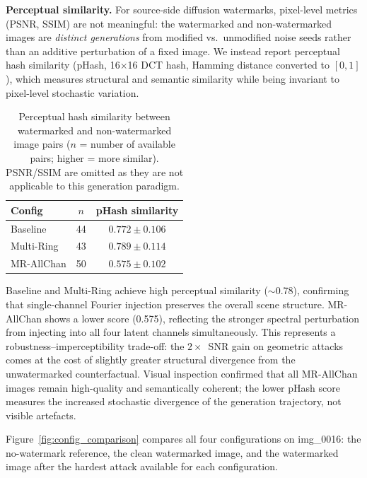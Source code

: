 \documentclass[10pt,twocolumn]{article}
\begin{document}
\textbf{Perceptual similarity.}
For source-side diffusion watermarks, pixel-level metrics (PSNR, SSIM)
are not meaningful: the watermarked and non-watermarked images are
\emph{distinct generations} from modified vs.\ unmodified noise seeds
rather than an additive perturbation of a fixed image.
We instead report perceptual hash similarity (pHash, 16$\times$16 DCT
hash, Hamming distance converted to $[0,1]$), which measures structural
and semantic similarity while being invariant to pixel-level stochastic
variation.

\begin{table}[htbp]
  \centering
  \caption{Perceptual hash similarity between watermarked and
    non-watermarked image pairs ($n$ = number of available pairs;
    higher = more similar). PSNR/SSIM are omitted as they are not
    applicable to this generation paradigm.}
  \label{tab:phash}
  \setlength{\tabcolsep}{4pt}
  \small
  \begin{tabular}{lcc}
    \toprule
    \textbf{Config} & $n$ & \textbf{pHash similarity} \\
    \midrule
    Baseline   & 44 & $0.772 \pm 0.106$ \\
    Multi-Ring & 43 & $0.789 \pm 0.114$ \\
    MR-AllChan & 50 & $0.575 \pm 0.102$ \\
    \bottomrule
  \end{tabular}
\end{table}

Baseline and Multi-Ring achieve high perceptual similarity ($\sim$0.78),
confirming that single-channel Fourier injection preserves the overall
scene structure.
MR-AllChan shows a lower score (0.575), reflecting the stronger spectral
perturbation from injecting into all four latent channels simultaneously.
This represents a robustness--imperceptibility trade-off: the
$2\times$~SNR gain on geometric attacks comes at the cost of slightly
greater structural divergence from the unwatermarked counterfactual.
Visual inspection confirmed that all MR-AllChan images remain
high-quality and semantically coherent; the lower pHash score measures
the increased stochastic divergence of the generation trajectory, not
visible artefacts.

Figure~\ref{fig:config_comparison} compares all four configurations
on img\_0016: the no-watermark reference, the clean
watermarked image, and the watermarked image after the hardest attack
available for each configuration.
\end{document}
